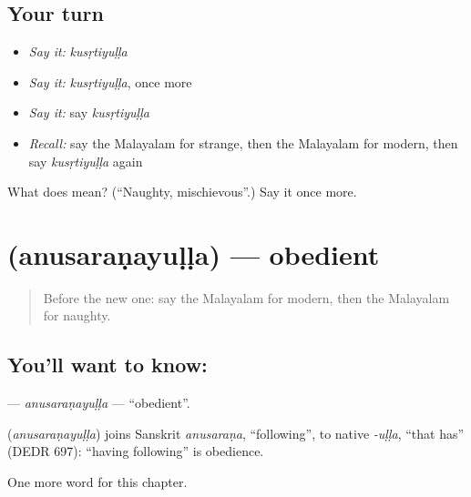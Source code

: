 \subsection*{Your turn}
\begin{itemize}
\raggedright
  \item \emph{Say it:} \emph{kusṛtiyuḷḷa}
  \item \emph{Say it:} \emph{kusṛtiyuḷḷa}, once more
  \item \emph{Say it:} say \emph{kusṛtiyuḷḷa}
  \item \emph{Recall:} say the Malayalam for strange, then the Malayalam for modern, then say \emph{kusṛtiyuḷḷa} again
\end{itemize}

\begin{tcolorbox}[breakable,colback=teal!4,colframe=teal!35!black,title={Before you move on}]
What does  mean? (\textquotedblleft{}Naughty, mischievous\textquotedblright{}.) Say it once more.
\end{tcolorbox}
\section[\texorpdfstring{\ml{അനുസരണയുള്ള} (anusaraṇayuḷḷa)}{അനുസരണയുള്ള (anusaraṇayuḷḷa)}]{ (anusaraṇayuḷḷa) — obedient}

\label{lesson:ML-C206-anusaranayulla}



\begin{quote}
Before the new one: say the Malayalam for modern, then the Malayalam for naughty.
\end{quote}

\subsection*{You'll want to know: }
\textbf{} — \emph{anusaraṇayuḷḷa} — \textquotedblleft{}obedient\textquotedblright{}.

\begin{cousinweb}
\textbf{} (\emph{anusaraṇayuḷḷa}) joins Sanskrit \emph{anusaraṇa}, \textquotedblleft{}following\textquotedblright{}, to native \emph{-uḷḷa}, \textquotedblleft{}that has\textquotedblright{} (DEDR 697): \textquotedblleft{}having following\textquotedblright{} is obedience.
\end{cousinweb}

\begin{grammarlens}[title={What you've built}]
One more word for this chapter.
\end{grammarlens}

